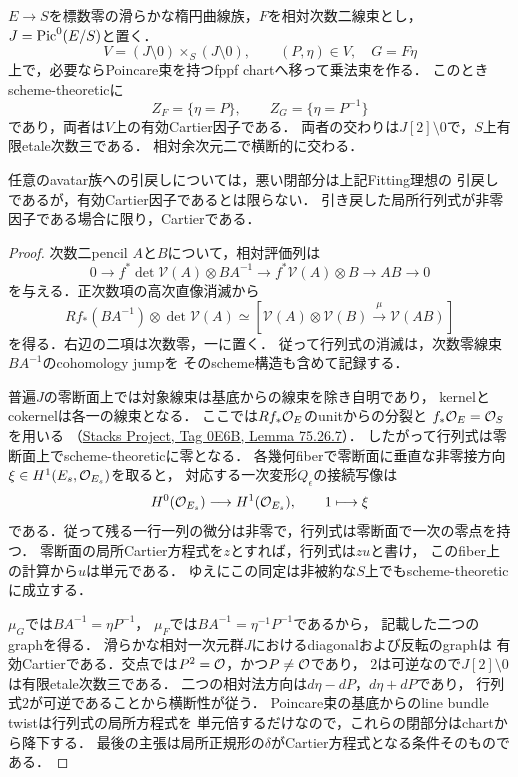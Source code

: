 \begin{proposition}
\label{prop:qa-relative-universal-cartier-walls}
$E\to S$を標数零の滑らかな楕円曲線族，$F$を相対次数二線束とし，
$J=\operatorname{Pic}^0(E/S)$と置く．
\[
 V=(J\setminus0)\times_S(J\setminus0),\qquad
 (P,\eta)\in V,\quad G=F\eta
\]
上で，必要ならPoincare束を持つfppf chartへ移って乗法束を作る．
このときscheme-theoreticに
\[
 Z_F=\{\eta=P\},\qquad Z_G=\{\eta=P^{-1}\}
\]
であり，両者は$V$上の有効Cartier因子である．
両者の交わりは$J[2]\setminus0$で，$S$上有限etale次数三である．
相対余次元二で横断的に交わる．

任意のavatar族への引戻しについては，悪い閉部分は上記Fitting理想の
引戻しであるが，有効Cartier因子であるとは限らない．
引き戻した局所行列式が非零因子である場合に限り，Cartierである．
\end{proposition}
\begin{proof}
次数二pencil $A$と$B$について，相対評価列は
\[
 0\to f^*\det\mathcal V(A)\otimes BA^{-1}
 \to f^*\mathcal V(A)\otimes B\to AB\to0
\]
を与える．正次数項の高次直像消滅から
\[
 Rf_*(BA^{-1})\otimes\det\mathcal V(A)
 \simeq
 [\mathcal V(A)\otimes\mathcal V(B)\xrightarrow{\mu}\mathcal V(AB)]
\]
を得る．右辺の二項は次数零，一に置く．
従って行列式の消滅は，次数零線束$BA^{-1}$のcohomology jumpを
そのscheme構造も含めて記録する．

普遍$J$の零断面上では対象線束は基底からの線束を除き自明であり，
kernelとcokernelは各一の線束となる．
ここでは$Rf_*\mathcal O_E$のunitからの分裂と
$f_*\mathcal O_E=\mathcal O_S$を用いる
（\href{https://stacks.math.columbia.edu/tag/0E6B}
{Stacks Project, Tag 0E6B, Lemma 75.26.7}）．
したがって行列式は零断面上でscheme-theoreticに零となる．
各幾何fiberで零断面に垂直な非零接方向
$\xi\in H^1(E_s,\mathcal O_{E_s})$を取ると，
対応する一次変形$Q_\epsilon$の接続写像は
\[
 H^0(\mathcal O_{E_s})\longrightarrow H^1(\mathcal O_{E_s}),\qquad1\longmapsto\xi
\]
である．従って残る一行一列の微分は非零で，行列式は零断面で一次の零点を持つ．
零断面の局所Cartier方程式を$z$とすれば，行列式は$zu$と書け，
このfiber上の計算から$u$は単元である．
ゆえにこの同定は非被約な$S$上でもscheme-theoreticに成立する．

$\mu_G$では$BA^{-1}=\eta P^{-1}$，
$\mu_F$では$BA^{-1}=\eta^{-1}P^{-1}$であるから，
記載した二つのgraphを得る．
滑らかな相対一次元群$J$におけるdiagonalおよび反転のgraphは
有効Cartierである．交点では$P^2=\mathcal O$，かつ$P\ne\mathcal O$であり，
$2$は可逆なので$J[2]\setminus0$は有限etale次数三である．
二つの相対法方向は$d\eta-dP$，$d\eta+dP$であり，
行列式$2$が可逆であることから横断性が従う．
Poincare束の基底からのline bundle twistは行列式の局所方程式を
単元倍するだけなので，これらの閉部分はchartから降下する．
最後の主張は局所正規形の$\delta$がCartier方程式となる条件そのものである．
\end{proof}

